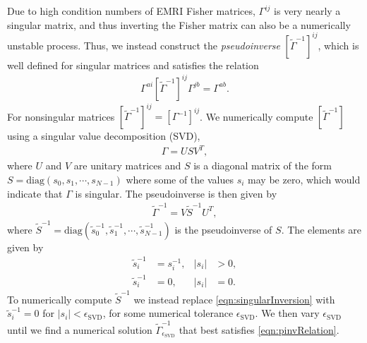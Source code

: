 \documentclass[%
 reprint,
 nofootinbib,
 amsmath,amssymb,
 aps,
 prd,
]{revtex4-2}
\begin{document}
Due to high condition numbers of EMRI Fisher matrices, $\Gamma^{ij}$ is very nearly a singular matrix, and thus inverting the Fisher matrix can also be a numerically unstable process. Thus, we instead construct the \emph{pseudoinverse} $[\tilde{\Gamma}^{-1}]^{ij}$, which is well defined for singular matrices and satisfies the relation
\begin{align} \label{eqn:pinvRelation}
    \Gamma^{ai}[\tilde{\Gamma}^{-1}]^{ij} \Gamma^{jb} = \Gamma^{ab}.
\end{align}
For nonsingular matrices $[\tilde{\Gamma}^{-1}]^{ij} = [{\Gamma}^{-1}]^{ij}$. We numerically compute $[\tilde{\Gamma}^{-1}]$ using a singular value decomposition (SVD),
\begin{align}
    \Gamma = U S V^T,
\end{align}
where $U$ and $V$ are unitary matrices and $S$ is a diagonal matrix of the form $S = \mathrm{diag}(s_0, s_1, \cdots, s_{N-1})$ where some of the values $s_i$ may be zero, which would indicate that $\Gamma$ is singular. The pseudoinverse is then given by
\begin{align}
    \tilde{\Gamma}^{-1} = V \tilde{S}^{-1} U^T,
\end{align}
where $\tilde{S}^{-1} = \mathrm{diag}(\tilde{s}_0^{-1}, \tilde{s}_1^{-1}, \cdots, \tilde{s}_{N-1}^{-1})$ is the pseudoinverse of $S$. The elements are given by
\begin{subequations}
    \begin{align}
    \tilde{s}_i^{-1} &= s_i^{-1}, & |s_i| &> 0,
    \\ \label{eqn:singularInversion}
    \tilde{s}_i^{-1} &= 0, & |s_i| &= 0.
\end{align}
\end{subequations}
To numerically compute $\tilde{S}^{-1}$ we instead replace \eqref{eqn:singularInversion} with $\tilde{s}_i^{-1} = 0$ for $|s_i| < \epsilon_\mathrm{SVD}$, for some numerical tolerance $\epsilon_\mathrm{SVD}$. We then vary $\epsilon_\mathrm{SVD}$ until we find a numerical solution $\tilde{\Gamma}^{-1}_{\epsilon_\mathrm{SVD}}$ that best satisfies \eqref{eqn:pinvRelation}.
\end{document}
